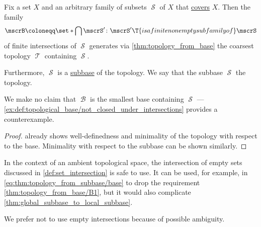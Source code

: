 \begin{proposition}\label{thm:topology_from_subbase}
  Fix a set \( X \) and an arbitrary family of subsets \( \mscrS \) of \( X \) that \hyperref[def:set_cover]{covers} \( X \). Then the family
  \begin{equation}\label{eq:thm:topology_from_subbase/base}
    \mscrB \coloneqq \set*{ \bigcap \mscrS' \colon \mscrS' \T{is a finite nonempty subfamily of} \mscrS }
  \end{equation}
  of finite intersections of \( \mscrS \) generates via \cref{thm:topology_from_base} the coarsest topology \( \mscrT \) containing \( \mscrS \).

  Furthermore, \( \mscrS \) is a \hyperref[def:topological_subbase]{subbase} of the topology. We say that the subbase \( \mscrS \)  the topology.
\end{proposition}
\begin{comments}
  \item We make no claim that \( \mscrB \) is the smallest base containing \( \mscrS \) --- \cref{ex:def:topological_base/not_closed_under_intersections} provides a counterexample.
\end{comments}
\begin{proof}
   already shows well-definedness and minimality of the topology with respect to the base. Minimality with respect to the subbase can be shown similarly.
\end{proof}

\begin{remark}\label{rem:subbase_and_empty_intersection}
  In the context of an ambient topological space, the intersection of empty sets discussed in \cref{def:set_intersection} is safe to use. It can be used, for example, in \eqref{eq:thm:topology_from_subbase/base} to drop the requirement \ref{thm:topology_from_base/B1}, but it would also complicate \cref{thm:global_subbase_to_local_subbase}.

  We prefer not to use empty intersections because of possible ambiguity.
\end{remark}

